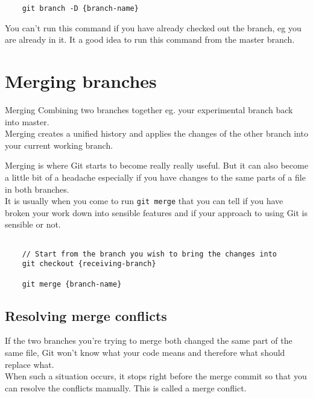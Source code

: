 \begin{verbatim}
    git branch -D {branch-name}
\end{verbatim}

You can't run this command if you have already checked out the branch, eg you are already in it. It a good idea to run this command from the master branch.

\section{Merging branches}

\begin{infobox}{Merging}
	Combining two branches together eg. your experimental branch back into master.
	\\ 
	
	Merging creates a unified history and applies the changes of the other branch into your current working branch.
\end{infobox}

Merging is where Git starts to become really really useful. But it can also become a little bit of a headache especially if you have changes to the same parts of a file in both branches.
\\

It is usually when you come to run \texttt{git merge} that you can tell if you have broken your work down into sensible features and if your approach to using Git is sensible or not.
\\

\begin{verbatim}

    // Start from the branch you wish to bring the changes into
    git checkout {receiving-branch}

    git merge {branch-name}
\end{verbatim}

\subsection{Resolving merge conflicts}

If the two branches you're trying to merge both changed the same part of the same file, Git won't know what your code means and therefore what should replace what. 
\\

When such a situation occurs, it stops right before the merge commit so that you can resolve the conflicts manually. This is called a merge conflict.
\\

